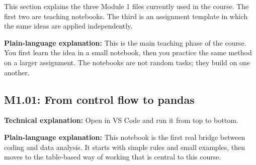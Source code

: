 \documentclass[11pt,a4paper]{article}
\begin{document}
This section explains the three Module 1 files currently used in the course. The first two are teaching notebooks. The third is an assignment template in which the same ideas are applied independently.

\textbf{Plain-language explanation:} This is the main teaching phase of the course. You first learn the idea in a small notebook, then you practice the same method on a larger assignment. The notebooks are not random tasks; they build on one another.

\subsection{M1.01: From control flow to pandas}
\textbf{Technical explanation:} Open  in VS Code and run it from top to bottom.

\textbf{Plain-language explanation:} This notebook is the first real bridge between coding and data analysis. It starts with simple rules and small examples, then moves to the table-based way of working that is central to this course.
\end{document}
